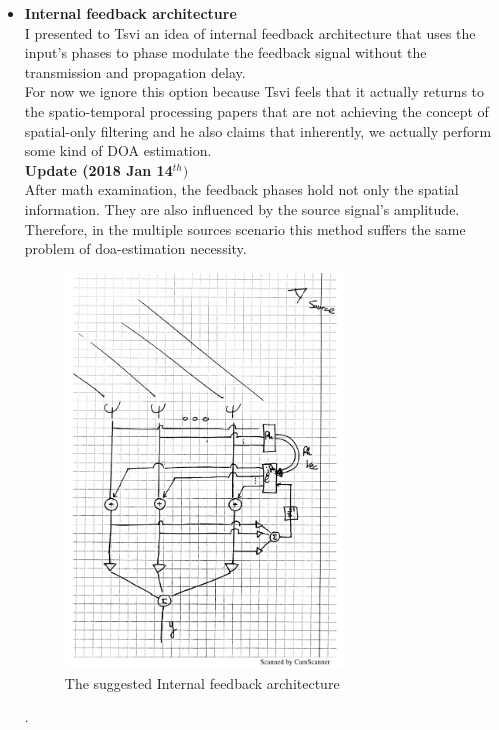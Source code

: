 \documentclass[12pt]{article}
\begin{document}
\begin{itemize}
{\\
We want to evaluate the affects of both update rate and phase step size on the system's performance.
}
\item {
\textbf{Internal feedback architecture}
\\
I presented to Tsvi an idea of internal feedback architecture that uses the input's phases to phase modulate the feedback signal without the transmission and propagation delay.
\\
For now we ignore this option because Tsvi feels that it actually returns to the spatio-temporal processing papers that are not achieving the concept of spatial-only filtering and he also claims that inherently, we actually perform some kind of DOA estimation.
\\
\textbf{Update (2018 Jan 14$^{th})$}
\\
After math examination, the feedback phases hold not only the spatial information. They are also influenced by the source signal's amplitude. Therefore, in the multiple sources scenario this method suffers the same problem of doa-estimation necessity.
\begin{figure}[!h]
\begin{center}
\includegraphics[width=0.7\textwidth]{Media/local_feedback_arch.pdf}
\caption{The suggested Internal feedback architecture}
\end{center}
\end{figure}.
}
\end{itemize}
\end{document}
